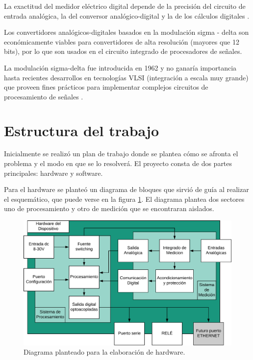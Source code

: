 La exactitud del medidor eléctrico digital depende de la precisión del circuito de entrada analógica, la del conversor analógico-digital y la de los cálculos digitales \citep{Hribik2004DigitalPA}.

Los convertidores analógicos-digitales basados en la modulación sigma - delta son económicamente viables para convertidores de alta resolución (mayores que 12 bits), por lo que son  usados en el circuito integrado de procesadores de señales.

La modulación sigma-delta fue introducida en 1962 y no ganaría importancia hasta recientes desarrollos en tecnologías VLSI (integración a escala muy grande) que proveen fines prácticos para implementar complejos circuitos de procesamiento de señales \citep{book:28601}.


\section{Estructura del trabajo}

\label{sec:structdescript1}
Inicialmente se realizó un plan de trabajo donde se plantea cómo se afronta el problema y el modo en que se lo resolverá. El proyecto consta de dos partes principales: hardware y software.

Para el hardware se planteó un diagrama de bloques que sirvió de guía al realizar el esquemático, que puede verse en la figura \ref{fig:bloquess1}. El diagrama plantea dos sectores uno de procesamiento y otro de medición que se encontraran aislados.

\begin{figure}[h]
	\centering
	\includegraphics[width=120mm,keepaspectratio]{Figures/concepto.jpeg}
	\caption{Diagrama planteado para la elaboración de hardware.}
	\label{fig:bloquess1}
\end{figure}

